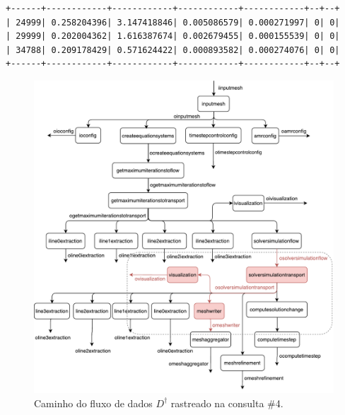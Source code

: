 \begin{lstlisting}[language=sqlresults,label={lst:experiments-4-sqlresults},caption={[Resultados da consulta \#4.]Resultados da consulta \#4 (3 tuplas, tempo médio: 13,62~ms).}]
+------+------------+------------+------------+------------+--+--+
| 24999| 0.258204396| 3.147418846| 0.005086579| 0.000271997| 0| 0|
| 29999| 0.202004362| 1.616387674| 0.002679455| 0.000155539| 0| 0|
| 34788| 0.209178429| 0.571624422| 0.000893582| 0.000274076| 0| 0|
+------+------------+------------+------------+------------+--+--+
\end{lstlisting}

\begin{figure}[htb]
    \centering
    \includegraphics[width=\textwidth]{img/experiments-dataflow-4}
    \caption[Caminho do fluxo de dados \(D^{\dagger}\) rastreado na consulta \#4]{Caminho do fluxo de dados \(D^{\dagger}\) rastreado na consulta \#4.}%
    \label{fig:experiments-dataflow-4}
\end{figure}

